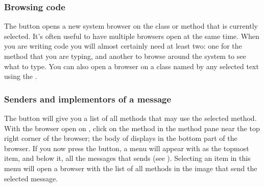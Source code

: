 \documentclass[a4paper,10pt,twoside]{book}
\begin{document}
\subsubsection{Browsing code}
\label{sec:browsing}

The  button opens a new system browser on the class or method that is currently selected. It's often useful to have multiple browsers open at the same time.
When you are writing code you will almost certainly need at least two: one for the method that you are typing, and another to browse around the system to see what to type.
You can also open a browser on a class named by any selected text using the  . 


\subsubsection{Senders and implementors of a message}
\label{sec:sendersImplementors}

The  button will give you a list of all methods that may use the selected method. With the browser open on , click on the  method in the method pane near the top right corner of the browser; the body of  displays in the bottom part of the browser. If you now press the  button, a menu will appear with  as the topmost item, and below it, all the messages that  sends (see ).  Selecting an item in this menu will open a browser with the list of all methods in the image that send the selected message. 
\end{document}
